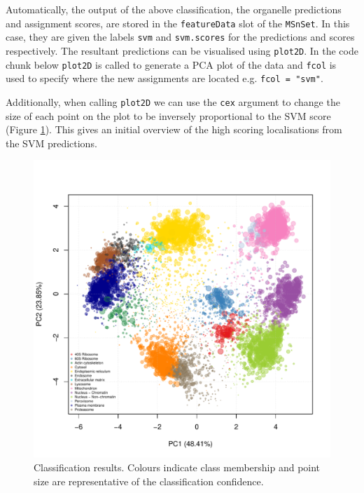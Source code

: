 Automatically, the output of the above classification, the organelle
predictions and assignment scores, are stored in the
\texttt{featureData} slot of the \texttt{MSnSet}. In this case, they
are given the labels \texttt{svm} and \texttt{svm.scores} for the
predictions and scores respectively. The resultant predictions can be
visualised using \texttt{plot2D}. In the code chunk below
\texttt{plot2D} is called to generate a PCA plot of the data and
\texttt{fcol} is used to specify where the new assignments are located
e.g. \texttt{fcol = "svm"}.

Additionally, when calling \texttt{plot2D} we can use the \texttt{cex}
argument to change the size of each point on the plot to be inversely
proportional to the SVM score (Figure \ref{fig:plotSVM}). This gives an initial overview of the
high scoring localisations from the SVM predictions.



\begin{figure}[!ht]
  \centering
\begin{knitrout}
\color{fgcolor}\begin{kframe}
\begin{alltt}
 \hlkwb{<-} \hlstd{(}\hlopt{$} \hlopt{-} 
  \hlstd{=} \hlstd{,}  
  \hlstd{=} \hlstd{,}  \hlstd{=} \hlstd{,}  \hlstd{=} \hlstd{,}  \hlstd{=} \hlstd{)}
\end{alltt}
\end{kframe}
\includegraphics[width=.8\textwidth]{figure/plotSVM-1} 

\end{knitrout}
\caption{Classification results. Colours indicate class membership and
  point size are representative of the classification confidence.}
  \label{fig:plotSVM}
\end{figure}
\pagebreak

